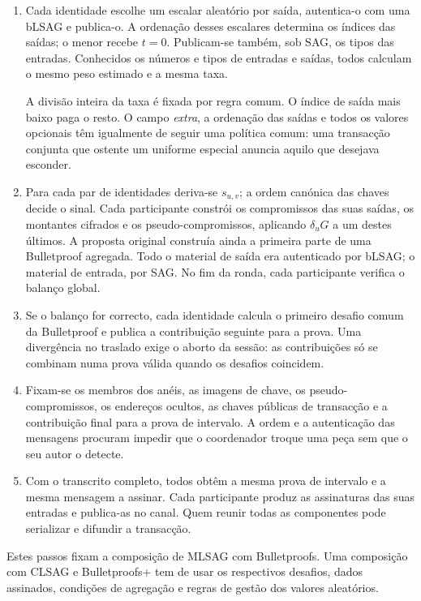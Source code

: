 \begin{enumerate}
 \item Cada identidade escolhe um escalar aleatório por saída, autentica-o com
 uma bLSAG e publica-o. A ordenação desses escalares determina os índices das
 saídas; o menor recebe \(t=0\). Publicam-se também, sob SAG, os tipos das
 entradas. Conhecidos os números e tipos de entradas e saídas, todos calculam
 o mesmo peso estimado e a mesma taxa.

 A divisão inteira da taxa é fixada por regra comum. O índice de saída mais
 baixo paga o resto. O campo \emph{extra}, a ordenação das saídas e todos os
 valores opcionais têm igualmente de seguir uma política comum: uma
 transacção conjunta que ostente um uniforme especial anuncia aquilo que
 desejava esconder.

 \item Para cada par de identidades deriva-se \(s_{u,v}\); a ordem canónica
 das chaves decide o sinal. Cada participante constrói os compromissos das
 suas saídas, os montantes cifrados e os pseudo-compromissos, aplicando
 \(\delta_uG\) a um destes últimos. A proposta original construía ainda a
 primeira parte de uma Bulletproof agregada. Todo o material de saída era
 autenticado por bLSAG; o material de entrada, por SAG. No fim da ronda, cada
 participante verifica o balanço global.

 \item Se o balanço for correcto, cada identidade calcula o primeiro desafio
 comum da Bulletproof e publica a contribuição seguinte para a prova. Uma
 divergência no traslado exige o aborto da sessão: as contribuições só
 se combinam numa prova válida quando os desafios coincidem.

 \item Fixam-se os membros dos anéis, as imagens de chave, os
 pseudo-compromissos, os endereços ocultos, as chaves públicas de transacção e
 a contribuição final para a prova de intervalo. A ordem e a autenticação das
 mensagens procuram impedir que o coordenador troque uma peça sem que o seu
 autor o detecte.

 \item Com o transcrito completo, todos obtêm a mesma prova de intervalo e a
 mesma mensagem a assinar. Cada participante produz as assinaturas das suas
 entradas e publica-as no canal. Quem reunir todas as componentes pode
 serializar e difundir a transacção.
\end{enumerate}

Estes passos fixam a composição de MLSAG com Bulletproofs. Uma composição
com CLSAG e Bulletproofs+ tem de usar os respectivos desafios, dados
assinados, condições de agregação e regras de gestão dos valores aleatórios.

